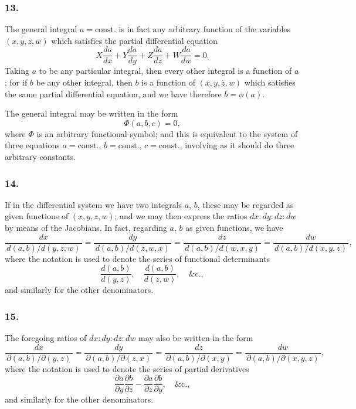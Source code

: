 \documentclass[12pt,a4paper]{article}
\theoremstyle{plain}
\begin{document}
\newpage
\setcounter{page}{120}

\subsubsection*{13.}

The general integral $a = \text{const.}$ is in fact any arbitrary function of the variables $(x, y, z, w)$ which satisfies the partial differential equation
\[
X\frac{da}{dx} + Y\frac{da}{dy} + Z\frac{da}{dz} + W\frac{da}{dw} = 0.
\]
Taking $a$ to be any particular integral, then every other integral is a function of $a$; for if $b$ be any other integral, then $b$ is a function of $(x, y, z, w)$ which satisfies the same partial differential equation, and we have therefore $b = \phi(a)$.

The general integral may be written in the form
\[
\Phi(a, b, c) = 0,
\]
where $\Phi$ is an arbitrary functional symbol; and this is equivalent to the system of three equations $a = \text{const.}$, $b = \text{const.}$, $c = \text{const.}$, involving as it should do three arbitrary constants.

\subsubsection*{14.}

If in the differential system we have two integrals $a$, $b$, these may be regarded as given functions of $(x, y, z, w)$; and we may then express the ratios $dx : dy : dz : dw$ by means of the Jacobians. In fact, regarding $a$, $b$ as given functions, we have
\[
\frac{dx}{\,d(a, b)/d(y, z, w)\,} = \frac{dy}{\,d(a, b)/d(z, w, x)\,} = \frac{dz}{\,d(a, b)/d(w, x, y)\,} = \frac{dw}{\,d(a, b)/d(x, y, z)\,},
\]
where the notation is used to denote the series of functional determinants
\[
\frac{d(a, b)}{d(y, z)}, \quad \frac{d(a, b)}{d(z, w)}, \quad \&\text{c.},
\]
and similarly for the other denominators.

\subsubsection*{15.}

The foregoing ratios of $dx : dy : dz : dw$ may also be written in the form
\[
\frac{dx}{\,\partial(a, b)/\partial(y, z)\,} = \frac{dy}{\,\partial(a, b)/\partial(z, x)\,} = \frac{dz}{\,\partial(a, b)/\partial(x, y)\,} = \frac{dw}{\,\partial(a, b)/\partial(x, y, z)\,},
\]
where the notation is used to denote the series of partial derivatives
\[
\frac{\partial a}{\partial y}\frac{\partial b}{\partial z} - \frac{\partial a}{\partial z}\frac{\partial b}{\partial y}, \quad \&\text{c.},
\]
and similarly for the other denominators.
\end{document}
